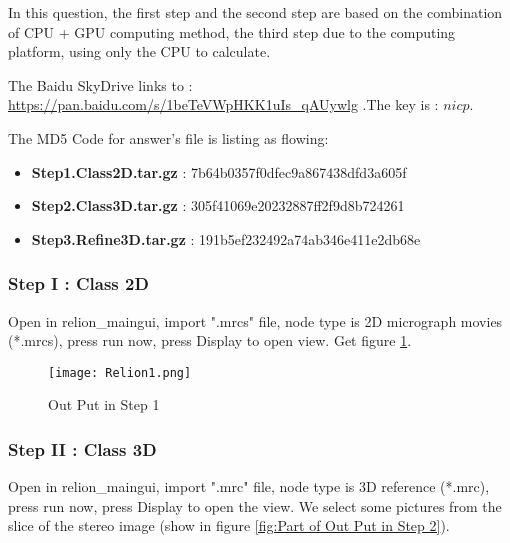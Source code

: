 \documentclass{mcmthesis}
\begin{document}
\par In this question, the first step and the second step are based on the combination of CPU + GPU computing method, the third step due to the computing platform, using only the CPU to calculate. 

\par The Baidu SkyDrive links to : \url{https://pan.baidu.com/s/1beTeVWpHKK1uIs_qAUywlg} .The key is : $nicp$.

\par The MD5 Code for answer's file is listing as flowing: 

\begin{itemize}
	\item \textbf{Step1.Class2D.tar.gz} : 7b64b0357f0dfec9a867438dfd3a605f
	\item \textbf{Step2.Class3D.tar.gz} : 305f41069e20232887ff2f9d8b724261
	\item \textbf{Step3.Refine3D.tar.gz} : 191b5ef232492a74ab346e411e2db68e
\end{itemize}


\subsubsection{Step I : Class 2D}

\par Open in relion\_maingui, import ".mrcs" file, node type is 2D micrograph movies (*.mrcs), press run now, press Display to open view. Get figure \ref{fig:Out Put in Step 1}.

\begin{figure}[!h]
\small
\centering
\texttt{[image: Relion1.png]}
\caption{Out Put in Step 1}
\label{fig:Out Put in Step 1}
\end{figure}


\subsubsection{Step II : Class 3D}


\par Open in relion\_maingui, import ".mrc" file, node type is 3D reference (*.mrc), press run now, press Display to open the view. We select some pictures from the slice of the stereo image (show in figure \ref{fig:Part of Out Put in Step 2}).
\end{document}
